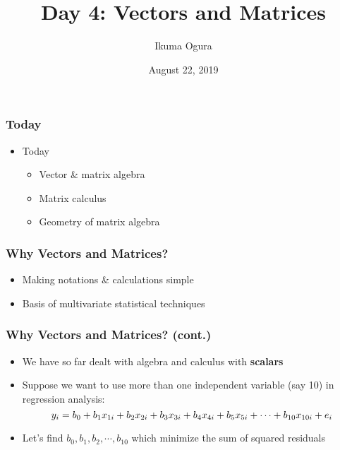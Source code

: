 \documentclass[pdflatex, 12pt]{beamer}
\title[Math Camp: Day 4]{Day 4: Vectors and Matrices}
\author[Ikuma Ogura]{Ikuma Ogura}
\institute[Georgetown]{Ph.D. student, Department of Government, Georgetown University}
\date[August 22, 2019]{August 22, 2019}
\begin{document}
\begin{frame}
\frametitle{}
\titlepage
\end{frame}

\begin{frame}
\frametitle{Today}
\begin{itemize}
\item Today
 \begin{itemize}
 \item Vector \& matrix algebra
 \item Matrix calculus
 \item Geometry of matrix algebra
 \end{itemize}
\end{itemize}
\end{frame}

\begin{frame}
\frametitle{Why Vectors and Matrices?}
\begin{itemize}
\item Making notations \& calculations simple
\vspace{0.4cm}
\item Basis of multivariate statistical techniques
\end{itemize}
\end{frame}

\begin{frame}
\frametitle{Why Vectors and Matrices? (cont.)}
\begin{itemize}
\item We have so far dealt with algebra and calculus with \textbf{scalars}
\vspace{0.4cm}
\item Suppose we want to use more than one independent variable (say 10) in regression analysis:
 \begin{equation}
 y_i = b_0 + b_1 x_{1i} + b_2 x_{2i} + b_3 x_{3i} + b_4 x_{4i} + b_5 x_{5i} + \cdots + b_{10} x_{10i} + e_i \notag
 \end{equation}
\item Let's find $b_0, b_1, b_2, \cdots, b_{10}$ which minimize the sum of squared residuals
\end{itemize}
\end{frame}
\end{document}
